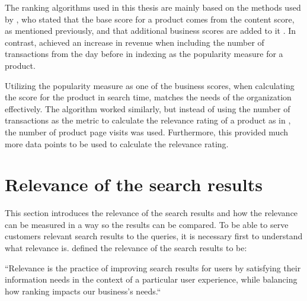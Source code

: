 The ranking algorithms used in this thesis are mainly based on the methods used by
\citeauthor{relevantSearch} \cite{relevantSearch}, who
stated that the base score for a product comes from the content score, as mentioned previously,
and that additional business scores are added to it \cite{relevantSearch}.
In contrast, \citeauthor{enhancingSearchBestSelling} \cite{enhancingSearchBestSelling} achieved an 
increase in revenue when including the number of transactions from the day before in indexing
as the popularity measure for a product.

Utilizing the popularity measure as one of the business scores, 
when calculating the score for the product in search time,
matches the needs of the organization effectively.
The algorithm worked similarly, but instead of using the number of transactions
as the metric to calculate the relevance rating of a product as in \cite{enhancingSearchBestSelling}, 
the number of product page visits was used.
Furthermore, this provided much more data points to be used to calculate the relevance rating.



\section{Relevance of the search results}
\label{sec:relevance}

This section introduces the relevance of the search results 
and how the relevance can be measured in a way so the results can be compared.
To be able to serve customers relevant search results to the queries, it is necessary first to understand 
what relevance is.
\citeauthor{relevantSearch} \cite{relevantSearch} defined the relevance of the search results to be:
\begin{displayquote}
``Relevance is the practice of improving search results for users by satisfying their 
information needs in the context of a particular user experience, 
while balancing how ranking impacts our business’s needs.``
\end{displayquote}


